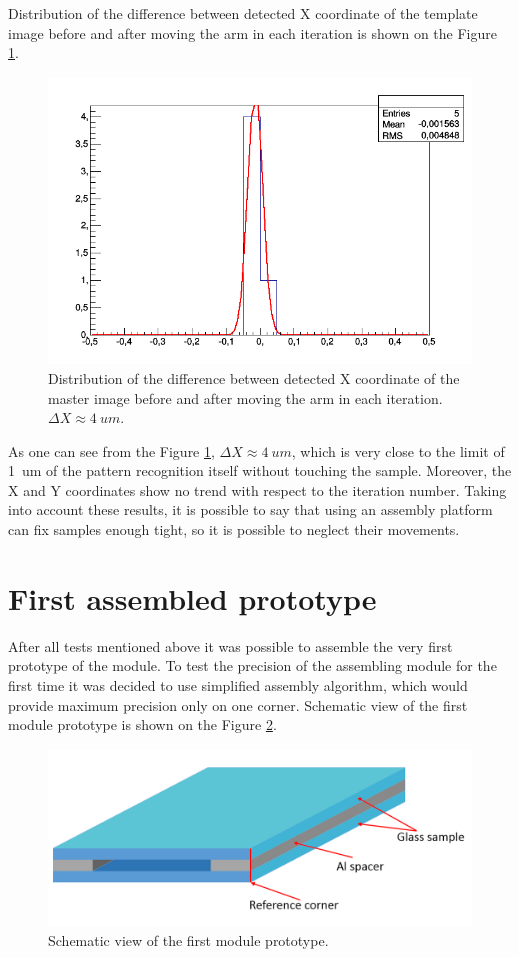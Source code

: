 Distribution of the difference between detected X coordinate of the template image before and after moving the arm in each iteration is shown on the Figure \ref{fig:platform_distribution}.

\begin{figure}[ht]\centering
\includegraphics[width=0.8\linewidth]{Data/Precision_tests/Platform_x_distrib.png}
\caption{Distribution of the difference between detected X coordinate of the master image before and after moving the arm in each iteration. $\Delta X \approx 4~um$. }
\label{fig:platform_distribution}
\end{figure}

As one can see from the Figure \ref{fig:platform_distribution}, $\Delta X \approx 4~um$, which is very close to the limit of 1~um of the pattern recognition itself without touching the sample. Moreover, the X and Y coordinates show no trend with respect to the iteration number. Taking into account these results, it is possible to say that using an assembly platform can fix samples enough tight, so it is possible to neglect their movements.

\section{First assembled prototype}

After all tests mentioned above it was possible to assemble the very first prototype of the module. To test the precision of the assembling module for the first time it was decided to use simplified assembly algorithm, which would provide maximum precision only on one corner. Schematic view of the first module prototype is shown on the Figure \ref{fig:module_prototype}.

\begin{figure}[ht]\centering
\includegraphics[width=0.8\linewidth]{Data/Precision_tests/Module_prototype.png}
\caption{Schematic view of the first module prototype.}
\label{fig:module_prototype}
\end{figure}

